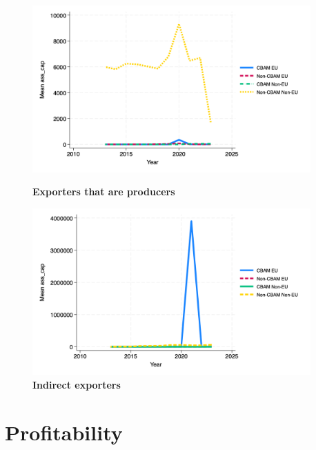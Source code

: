 \documentclass{article}
\begin{document}
\begin{figure}[H]
\centering
\includegraphics[width=0.95\textwidth]{ass_cap_ep.png}
\caption{\textbf{Exporters that are producers}}
\includegraphics[width=0.95\textwidth]{ass_cap_indir.png}
\caption{\textbf{Indirect exporters}}
\end{figure}

\section{Profitability}
\end{document}
